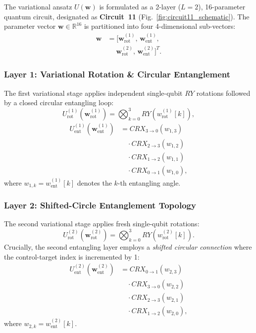 \documentclass[journal]{IEEEtran}
\begin{document}
The variational ansatz $U(\mathbf{w})$ is formulated as a 2-layer ($L=2$), 16-parameter quantum circuit, designated as \textbf{Circuit~11} (Fig.~\ref{fig:circuit11_schematic}). The parameter vector $\mathbf{w} \in \mathbb{R}^{16}$ is partitioned into four 4-dimensional sub-vectors:
\begin{align}
\mathbf{w} &= \big[ \mathbf{w}_{\mathrm{rot}}^{(1)}, \, \mathbf{w}_{\mathrm{ent}}^{(1)}, \nonumber \\
&\quad\; \mathbf{w}_{\mathrm{rot}}^{(2)}, \, \mathbf{w}_{\mathrm{ent}}^{(2)} \big]^T.
\label{eq:weight_partition}
\end{align}

\subsubsection{Layer 1: Variational Rotation \& Circular Entanglement}
The first variational stage applies independent single-qubit $RY$ rotations followed by a closed circular entangling loop:
\begin{equation}
U_{\mathrm{rot}}^{(1)}(\mathbf{w}_{\mathrm{rot}}^{(1)}) = \bigotimes_{k=0}^3 RY\left(w_{\mathrm{rot}}^{(1)}[k]\right),
\label{eq:rot_layer1}
\end{equation}
\begin{align}
U_{\mathrm{ent}}^{(1)}(\mathbf{w}_{\mathrm{ent}}^{(1)}) &= CRX_{3 \to 0}(w_{1,3}) \nonumber \\
&\quad \cdot CRX_{2 \to 3}(w_{1,2}) \nonumber \\
&\quad \cdot CRX_{1 \to 2}(w_{1,1}) \nonumber \\
&\quad \cdot CRX_{0 \to 1}(w_{1,0}),
\label{eq:ent_layer1}
\end{align}
where $w_{1,k} = w_{\mathrm{ent}}^{(1)}[k]$ denotes the $k$-th entangling angle.

\subsubsection{Layer 2: Shifted-Circle Entanglement Topology}
The second variational stage applies fresh single-qubit rotations:
\begin{equation}
U_{\mathrm{rot}}^{(2)}(\mathbf{w}_{\mathrm{rot}}^{(2)}) = \bigotimes_{k=0}^3 RY\left(w_{\mathrm{rot}}^{(2)}[k]\right).
\label{eq:rot_layer2}
\end{equation}
Crucially, the second entangling layer employs a \textit{shifted circular connection} where the control-target index is incremented by 1:
\begin{align}
U_{\mathrm{ent}}^{(2)}(\mathbf{w}_{\mathrm{ent}}^{(2)}) &= CRX_{0 \to 1}(w_{2,3}) \nonumber \\
&\quad \cdot CRX_{3 \to 0}(w_{2,2}) \nonumber \\
&\quad \cdot CRX_{2 \to 3}(w_{2,1}) \nonumber \\
&\quad \cdot CRX_{1 \to 2}(w_{2,0}),
\label{eq:ent_layer2}
\end{align}
where $w_{2,k} = w_{\mathrm{ent}}^{(2)}[k]$.
\end{document}
